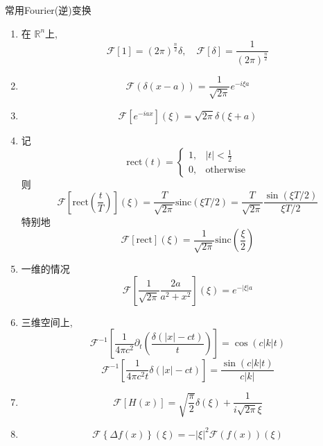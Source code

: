 \documentclass[../../main.tex]{subfiles}
\begin{document}
\begin{proposition}{常用Fourier(逆)变换}
    \begin{enumerate}
        \item 在 \(  \mathbb{R} ^{n}  \)上,  \[
        \mathcal{F}[1]=  \left( 2\pi  \right)^{\frac{n }{2 } }  \delta ,\quad \mathcal{F} [ \delta ]= \frac{1 }{\left( 2\pi  \right)^{\frac{n }{2 } }  } 
        \]
        \item \[
        \mathcal{F}\left(  \delta \left( x-a \right)  \right)=\frac{1 }{\sqrt{2\pi } }  e^{-i \xi a} 
        \]
        \item \[
        \mathcal{F}[e^{-iax}]\left(  \xi  \right) = \sqrt{2\pi }\delta \left(  \xi +   a \right)  
        \]
        \item 记 \[
        \mathrm{rect}\left( t \right)= \begin{cases} 1,&\left| t \right|< \frac{1 }{2 } \\ 
         0,& \text{otherwise}  \end{cases}  
        \]则 \[
        \mathcal{F}[  \mathrm{rect}\left( \frac{t }{T }  \right) ]\left(  \xi  \right) = \frac{T }{\sqrt{2\pi }}\mathrm{sinc}\left(  \xi T /2 \right)  = \frac{T }{\sqrt{2\pi }}\frac{\sin \left(  \xi T / 2 \right)  }{  \xi  T /2 }  
        \]特别地 \[
        \mathcal{F}[\mathrm{rect}]\left(  \xi  \right)= \frac{1 }{\sqrt{2\pi } } \mathrm{sinc}\left( \frac{ \xi  }{2 }  \right)    
        \]
        \item 一维的情况\[
        \mathcal{F}\left[ \frac{1 }{\sqrt{2\pi } }\frac{2a }{a^{2}+ x^{2} } \right]\left(  \xi  \right)  =e^{-\left|  \xi  \right|a } 
        \]
        \item 三维空间上, \[
        \mathcal{F}^{-1} [\frac{1 }{4\pi c^{2} } \partial _{t}\left( \frac{ \delta \left( \left| x \right|-ct  \right)  }{t }  \right)  ]= \cos \left( c\left| k \right|t  \right) 
        \]\[
        \mathcal{F}^{-1} [\frac{1 }{4\pi c^{2}t } \delta \left( \left| x \right|-ct  \right)  ]= \frac{\sin \left( c\left| k \right|t  \right)  }{c\left| k \right|  } 
        \]
       \item \[
       \mathcal{F}[H\left( x \right) ]= \sqrt{\frac{\pi  }{2 } } \delta \left(  \xi  \right)+ \frac{1 }{i\sqrt{2\pi } \xi  }  
       \]
        \item \[
        \mathcal{F}\left\{  \Delta f\left( x \right)  \right\}\left(  \xi  \right)= -\left|  \xi  \right|^{2}\mathcal{F}\left( f\left( x \right)  \right)\left(  \xi  \right)    
        \]
        
    \end{enumerate}
    
\end{proposition}
\end{document}
